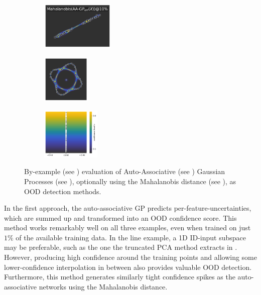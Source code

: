 \begin{figure}[H]
    \begin{subfigure}
        \centering
        \includegraphics[width=0.388\textwidth,valign=t]{ood-detection/figures/ood-detection/confidence-line-gp-xx-mahalanobis.pdf}
    \end{subfigure}
    \begin{subfigure}
        \centering
        \includegraphics[width=0.254\textwidth,valign=t]{ood-detection/figures/ood-detection/confidence-circle-gp-xx-mahalanobis.pdf}
    \end{subfigure}
    \begin{subfigure}
        \centering
        \includegraphics[width=0.308\textwidth,valign=t]{ood-detection/figures/ood-detection/confidence-haystack-gp-xx-mahalanobis.pdf}
    \end{subfigure}

    \caption[Comparison of Auto-Associative Gaussian Processes as OOD detection methods]{By-example (see ) evaluation of Auto-Associative (see ) Gaussian Processes (see ), optionally using the Mahalanobis distance (see ), as OOD detection methods.}
    \label{fig:auto-associative-gp-ood-detection}
\end{figure}

\noindent In the first approach, the auto-associative GP predicts per-feature-uncertainties, which are summed up and transformed into an OOD confidence score. This method works remarkably well on all three examples, even when trained on just $1\%$ of the available training data. In the line example, a 1D ID-input subspace may be preferable, such as the one the truncated PCA method extracts in . However, producing high confidence around the training points and allowing some lower-confidence interpolation in between also provides valuable OOD detection. Furthermore, this method generates similarly tight confidence spikes as the auto-associative networks using the Mahalanobis distance.

